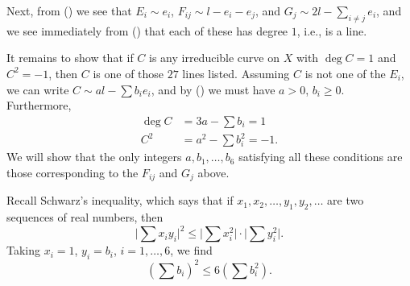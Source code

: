 {Next, from () we see that $E_i\sim e_i$, $F_{ij}\sim l-e_i-e_j$, and $G_j\sim 2l-\sum_{i\ne j}e_i$, and we see immediately from () that each of these has degree $1$, i.e., is a line.

It remains to show that if $C$ is any irreducible curve on $X$ with $\deg C=1$ and $C^2=-1$, then $C$ is one of those $27$ lines listed. Assuming $C$ is not one of the $E_i$, we can write $C\sim al-\sum b_ie_i$, and by () we must have $a>0$, $b_i\ge0$. Furthermore,
\[
\begin{aligned}
\deg C&=3a-\sum b_i=1\\
C^2&=a^2-\sum b_i^2=-1.
\end{aligned}
\]
We will show that the only integers $a,b_1,\dots,b_6$ satisfying all these conditions are those corresponding to the $F_{ij}$ and $G_j$ above.

Recall Schwarz's inequality, which says that if $x_1,x_2,\dots,y_1,y_2,\dots$ are two sequences of real numbers, then
\[
\bigl|\sum x_iy_i\bigr|^2\le\bigl|\sum x_i^2\bigr|\cdot\bigl|\sum y_i^2\bigr|.
\]
Taking $x_i=1$, $y_i=b_i$, $i=1,\dots,6$, we find
\[
(\sum b_i)^2\le6(\sum b_i^2).
\]}
